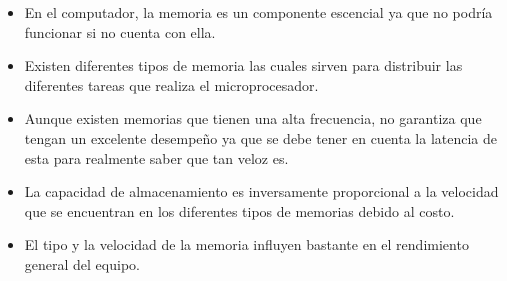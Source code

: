 \documentclass{article}
\begin{document}
\begin{itemize}
    \item En el computador, la memoria es un componente escencial ya que no podría funcionar si no cuenta con ella.
    \item Existen diferentes tipos de memoria las cuales sirven para distribuir las diferentes tareas que realiza el microprocesador.
    \item Aunque existen memorias que tienen una alta frecuencia, no garantiza que tengan un excelente desempeño ya que se debe tener en cuenta la latencia de esta para realmente saber que tan veloz es.
    \item La capacidad de almacenamiento es inversamente proporcional a la velocidad que se encuentran en los diferentes tipos de memorias debido al costo.
    \item El tipo y la velocidad de la memoria influyen bastante en el rendimiento general del equipo.
    
\end{itemize}



\end{document}

